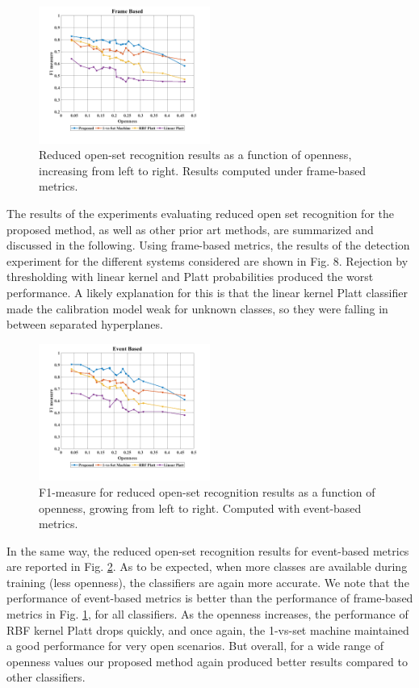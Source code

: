 \documentclass{ieeeaccess}
\begin{document}
\begin{figure}[t!]
	\centering
	\includegraphics[width=0.5\textwidth]{img/reduced_frame.png}
	\caption{Reduced open-set recognition results as a function of openness, increasing from left to right. Results computed under frame-based metrics.}
	\label{fig:fig8}
\end{figure}

The results of the experiments evaluating reduced open set recognition for the proposed method, as well as other prior art methods, are summarized and discussed in the following. Using frame-based metrics, the results of the detection experiment for the different systems considered are shown in Fig. 8. Rejection by thresholding with linear kernel and Platt probabilities produced the worst performance. A likely explanation for this is that the linear kernel Platt classifier made the calibration model weak for unknown classes, so they were falling in between separated hyperplanes.\\

\begin{figure}[t!]
	\centering
	\includegraphics[width=0.5\textwidth]{img/reduced_event.png}
	\caption{F1-measure for reduced open-set recognition results as a function of openness, growing from left to right. Computed with event-based metrics.}
	\label{fig:fig9}
\end{figure}
In the same way, the reduced open-set recognition results for event-based metrics are reported in Fig. \ref{fig:fig9}. As to be expected, when more classes are available during training (less openness), the classifiers are again more accurate. We note that the performance of event-based metrics is better than the performance of frame-based metrics in Fig. \ref{fig:fig8}, for all classifiers. As the openness increases, the performance of RBF kernel Platt drops quickly, and once again, the 1-vs-set machine maintained a good performance for very open scenarios. But overall, for a wide range of openness values our proposed method again produced better results compared to other classifiers.
\end{document}
